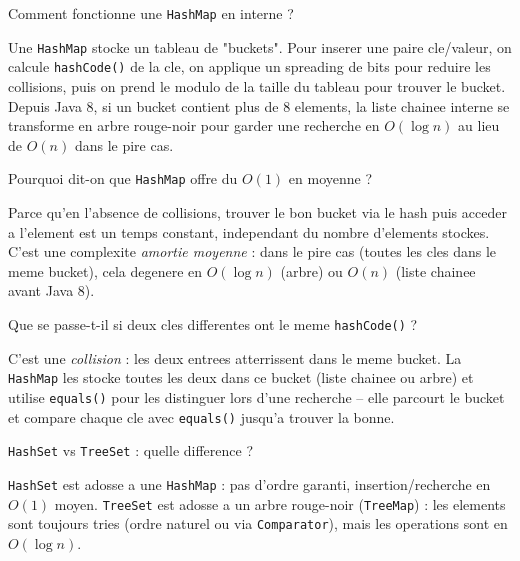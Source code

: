\documentclass[11pt,a4paper]{article}
\begin{document}
\begin{question} Comment fonctionne une \texttt{HashMap} en interne ?
\end{question}
\begin{reponse}
Une \texttt{HashMap} stocke un tableau de "buckets". Pour inserer une paire cle/valeur, on calcule \texttt{hashCode()} de la cle, on applique un spreading de bits pour reduire les collisions, puis on prend le modulo de la taille du tableau pour trouver le bucket. Depuis Java 8, si un bucket contient plus de 8 elements, la liste chainee interne se transforme en arbre rouge-noir pour garder une recherche en $O(\log n)$ au lieu de $O(n)$ dans le pire cas.
\end{reponse}

\begin{question} Pourquoi dit-on que \texttt{HashMap} offre du $O(1)$ en moyenne ?
\end{question}
\begin{reponse}
Parce qu'en l'absence de collisions, trouver le bon bucket via le hash puis acceder a l'element est un temps constant, independant du nombre d'elements stockes. C'est une complexite \emph{amortie moyenne} : dans le pire cas (toutes les cles dans le meme bucket), cela degenere en $O(\log n)$ (arbre) ou $O(n)$ (liste chainee avant Java 8).
\end{reponse}

\begin{question} Que se passe-t-il si deux cles differentes ont le meme \texttt{hashCode()} ?
\end{question}
\begin{reponse}
C'est une \emph{collision} : les deux entrees atterrissent dans le meme bucket. La \texttt{HashMap} les stocke toutes les deux dans ce bucket (liste chainee ou arbre) et utilise \texttt{equals()} pour les distinguer lors d'une recherche -- elle parcourt le bucket et compare chaque cle avec \texttt{equals()} jusqu'a trouver la bonne.
\end{reponse}

\begin{question} \texttt{HashSet} vs \texttt{TreeSet} : quelle difference ?
\end{question}
\begin{reponse}
\texttt{HashSet} est adosse a une \texttt{HashMap} : pas d'ordre garanti, insertion/recherche en $O(1)$ moyen. \texttt{TreeSet} est adosse a un arbre rouge-noir (\texttt{TreeMap}) : les elements sont toujours tries (ordre naturel ou via \texttt{Comparator}), mais les operations sont en $O(\log n)$.
\end{reponse}
\end{document}

